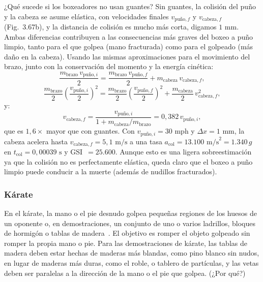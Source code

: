 \documentclass[12pt]{book}
\begin{document}
¿Qué sucede si los boxeadores no usan guantes? Sin guantes, la colisión del puño y la cabeza se asume elástica, con velocidades finales $v_{\text{puño},f}$ y $v_{\text{cabeza},f}$ (Fig.~3.67b), y la distancia de colisión es mucho más corta, digamos $1\text{ mm}$. Ambas diferencias contribuyen a las consecuencias más graves del boxeo a puño limpio, tanto para el que golpea (mano fracturada) como para el golpeado (más daño en la cabeza). Usando las mismas aproximaciones para el movimiento del brazo, junto con la conservación del momento y la energía cinética:
\begin{equation}
\frac{m_{\text{brazo}}\,v_{\text{puño},i}}{2} = \frac{m_{\text{brazo}}\,v_{\text{puño},f}}{2} + m_{\text{cabeza}}\,v_{\text{cabeza},f},
\label{eq:3.123}
\end{equation}
\begin{equation}
\frac{m_{\text{brazo}}}{2}\left(\frac{v_{\text{puño},i}}{2}\right)^2 = \frac{m_{\text{brazo}}}{2}\left(\frac{v_{\text{puño},f}}{2}\right)^2 + \frac{m_{\text{cabeza}}}{2}\,v_{\text{cabeza},f}^2,
\label{eq:3.124}
\end{equation}
y:
\begin{equation}
v_{\text{cabeza},f} = \frac{v_{\text{puño},i}}{1 + m_{\text{cabeza}}/m_{\text{brazo}}} = 0{,}382\,v_{\text{puño},i},
\label{eq:3.125}
\end{equation}
que es $1{,}6\times$ mayor que con guantes. Con $v_{\text{puño},i} = 30\text{ mph}$ y $\Delta x = 1\text{ mm}$, la cabeza acelera hasta $v_{\text{cabeza},f} = 5{,}1\text{ m/s}$ a una tasa $a_{\text{col}} = 13.100\text{ m/s}^2 = 1.340\,g$ en $t_{\text{col}} = 0{,}00039\text{ s}$ y GSI~$= 25.600$. Aunque esto es una ligera sobreestimación ya que la colisión no es perfectamente elástica, queda claro que el boxeo a puño limpio puede conducir a la muerte (además de nudillos fracturados).

\subsubsection*{Kárate}

En el kárate, la mano o el pie desnudo golpea pequeñas regiones de los huesos de un oponente o, en demostraciones, un conjunto de uno o varios ladrillos, bloques de hormigón o tablas de madera~\cite{ref16,ref44,ref144}. El objetivo es romper el objeto golpeado sin romper la propia mano o pie. Para las demostraciones de kárate, las tablas de madera deben estar hechas de maderas más blandas, como pino blanco sin nudos, en lugar de maderas más duras, como el roble, o tablero de partículas, y las vetas deben ser paralelas a la dirección de la mano o el pie que golpea. (¿Por qué?)
\end{document}
